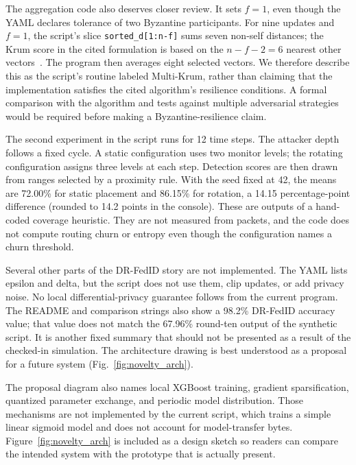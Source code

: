 \documentclass[conference]{IEEEtran}
\begin{document}
The aggregation code also deserves closer review. It sets $f=1$, even though the YAML declares tolerance of two Byzantine participants. For nine updates and $f=1$, the script's slice \texttt{sorted\_d[1:n-f]} sums seven non-self distances; the Krum score in the cited formulation is based on the $n-f-2=6$ nearest other vectors~\cite{blanchard2017machine}. The program then averages eight selected vectors. We therefore describe this as the script's routine labeled Multi-Krum, rather than claiming that the implementation satisfies the cited algorithm's resilience conditions. A formal comparison with the algorithm and tests against multiple adversarial strategies would be required before making a Byzantine-resilience claim.

The second experiment in the script runs for 12 time steps. The attacker depth follows a fixed cycle. A static configuration uses two monitor levels; the rotating configuration assigns three levels at each step. Detection scores are then drawn from ranges selected by a proximity rule. With the seed fixed at 42, the means are 72.00\% for static placement and 86.15\% for rotation, a 14.15 percentage-point difference (rounded to 14.2 points in the console). These are outputs of a hand-coded coverage heuristic. They are not measured from packets, and the code does not compute routing churn or entropy even though the configuration names a churn threshold.

Several other parts of the DR-FedID story are not implemented. The YAML lists epsilon and delta, but the script does not use them, clip updates, or add privacy noise. No local differential-privacy guarantee follows from the current program. The README and comparison strings also show a 98.2\% DR-FedID accuracy value; that value does not match the 67.96\% round-ten output of the synthetic script. It is another fixed summary that should not be presented as a result of the checked-in simulation. The architecture drawing is best understood as a proposal for a future system (Fig.~\ref{fig:novelty_arch}).

The proposal diagram also names local XGBoost training, gradient sparsification, quantized parameter exchange, and periodic model distribution. Those mechanisms are not implemented by the current script, which trains a simple linear sigmoid model and does not account for model-transfer bytes. Figure~\ref{fig:novelty_arch} is included as a design sketch so readers can compare the intended system with the prototype that is actually present.
\end{document}
